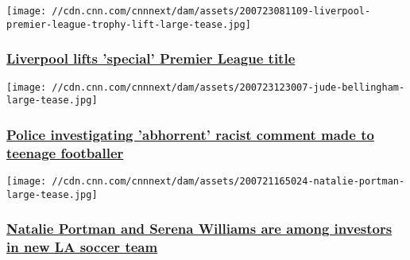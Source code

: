 \href{/2020/07/23/football/liverpool-chelsea-premier-league-trophy-lift-spt-intl-gbr/index.html}{}

\texttt{[image: //cdn.cnn.com/cnnnext/dam/assets/200723081109-liverpool-premier-league-trophy-lift-large-tease.jpg]}

\hypertarget{liverpool-lifts-special-premier-league-title}{%
\subsubsection{\texorpdfstring{\href{/2020/07/23/football/liverpool-chelsea-premier-league-trophy-lift-spt-intl-gbr/index.html}{Liverpool
lifts 'special' Premier League
title}}{Liverpool lifts 'special' Premier League title}}\label{liverpool-lifts-special-premier-league-title}}

\href{/2020/07/23/football/jude-bellingham-racist-abuse-twitter-spt-intl-gbr-ger/index.html}{}

\texttt{[image: //cdn.cnn.com/cnnnext/dam/assets/200723123007-jude-bellingham-large-tease.jpg]}

\hypertarget{police-investigating-abhorrent-racist-comment-made-to-teenage-footballer}{%
\subsubsection{\texorpdfstring{\href{/2020/07/23/football/jude-bellingham-racist-abuse-twitter-spt-intl-gbr-ger/index.html}{Police
investigating 'abhorrent' racist comment made to teenage
footballer}}{Police investigating 'abhorrent' racist comment made to teenage footballer}}\label{police-investigating-abhorrent-racist-comment-made-to-teenage-footballer}}

\href{/2020/07/21/football/los-angeles-womens-soccer-team-serena-williams-natalie-portman-spt-intl/index.html}{}

\texttt{[image: //cdn.cnn.com/cnnnext/dam/assets/200721165024-natalie-portman-large-tease.jpg]}

\hypertarget{natalie-portman-and-serena-williams-are-among-investors-in-new-la-soccer-team}{%
\subsubsection{\texorpdfstring{\href{/2020/07/21/football/los-angeles-womens-soccer-team-serena-williams-natalie-portman-spt-intl/index.html}{Natalie
Portman and Serena Williams are among investors in new LA soccer
team}}{Natalie Portman and Serena Williams are among investors in new LA soccer team}}\label{natalie-portman-and-serena-williams-are-among-investors-in-new-la-soccer-team}}

